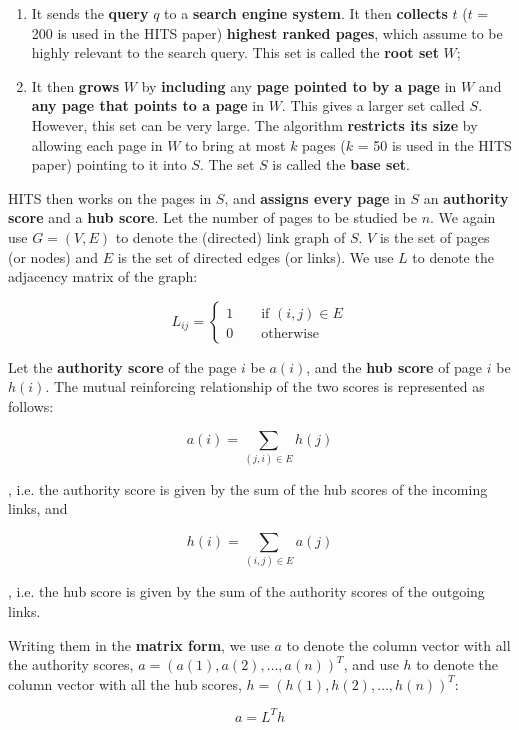 \begin{enumerate}
    \item It sends the \textbf{query} $q$ to a \textbf{search engine system}. It then \textbf{collects} $t$ ($t$ = 200 is used in the HITS paper) \textbf{highest ranked pages}, which assume to be highly relevant to the search query. This set is called the \textbf{root set} $W$;
    \item It then \textbf{grows} $W$ by \textbf{including} any \textbf{page pointed to by a page} in $W$ and \textbf{any page that points to a page} in $W$. This gives a larger set called $S$. However, this set can be very large. The algorithm \textbf{restricts its size} by allowing each page in $W$ to bring at most $k$ pages ($k$ = 50 is used in the HITS paper) pointing to it into $S$. The set $S$ is called the \textbf{base set}.
\end{enumerate}

HITS then works on the pages in $S$, and \textbf{assigns every page} in $S$ an \textbf{authority score} and a \textbf{hub score}. Let the number of pages to be studied be $n$. We again use $G = (V, E)$ to denote the (directed) link graph of $S$. $V$ is the set of pages (or nodes) and $E$ is the set of directed edges (or links). We use $L$ to denote the adjacency matrix of the graph:

$$
L_{ij} = \begin{cases}
    1 \qquad \text{if } (i,j) \in E \\
    0 \qquad \text{otherwise}
\end{cases}
$$

Let the \textbf{authority score} of the page $i$ be $a(i)$, and the \textbf{hub score} of page $i$ be $h(i)$. The mutual reinforcing relationship of the two scores is represented as follows:

$$
a(i) = \sum_{(j,i) \in E} h(j)
$$

, i.e. the authority score is given by the sum of the hub scores of the incoming links, and

$$
h(i) = \sum_{(i,j) \in E} a(j)
$$

, i.e. the hub score is given by the sum of the authority scores of the outgoing links.

Writing them in the \textbf{matrix form}, we use $a$ to denote the column vector with all the authority scores, $a = (a(1), a(2), …, a(n))^T$, and use $h$ to denote the column vector with all the hub scores, $h = (h(1), h(2), …, h(n))^T$:

\begin{equation}
    a = L^T h
\end{equation}

